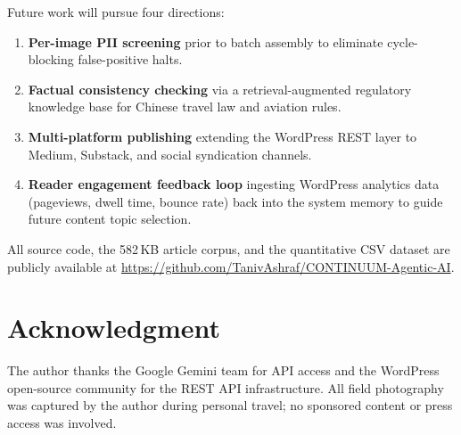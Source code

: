 \documentclass[conference]{IEEEtran}
\begin{document}
Future work will pursue four directions:
\begin{enumerate}
  \item \textbf{Per-image PII screening} prior to batch assembly to eliminate
        cycle-blocking false-positive halts.
  \item \textbf{Factual consistency checking} via a retrieval-augmented
        regulatory knowledge base for Chinese travel law and aviation rules.
  \item \textbf{Multi-platform publishing} extending the WordPress REST layer
        to Medium, Substack, and social syndication channels.
  \item \textbf{Reader engagement feedback loop} ingesting WordPress analytics
        data (pageviews, dwell time, bounce rate) back into the system memory
        to guide future content topic selection.
\end{enumerate}

All source code, the 582\,KB article corpus, and the quantitative CSV dataset
are publicly available at \url{https://github.com/TanivAshraf/CONTINUUM-Agentic-AI}.

\section*{Acknowledgment}

The author thanks the Google Gemini team for API access and the WordPress
open-source community for the REST API infrastructure. All field photography
was captured by the author during personal travel; no sponsored content
or press access was involved.
\end{document}
